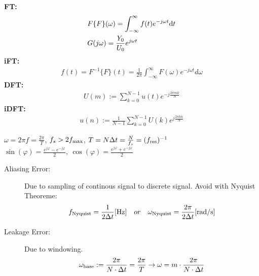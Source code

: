 \begin{tcolorbox}[colback=brown!5!white,colframe=brown!75!black,title=\textbf{Fourier Transformation}]
	\textbf{FT:}\begin{align*}
				  &F\{F\}(\omega) = \int_{-\infty}^{\infty} f(t) e^{-j\omega t}\mathrm{d} t\\
				  &G(j\omega)=\frac{Y_0}{U_0}e^{j\omega t}
	\end{align*}
	\textbf{iFT:}\begin{align*}
	f(t) = F^{-1}\{F\}(t) = \frac{1}{2\pi}\int_{-\infty}^{\infty} F(\omega) e^{-j\omega t}d\omega
	\end{align*}
	\textbf{DFT:}\begin{align*}
	U(m) := \sum_{k = 0}^{N-1} u(t)e^{-j\frac{2\pi m k}{N}}
	\end{align*}
	\textbf{iDFT:}\begin{align*}
	u(n) := \frac{1}{N-1}\sum_{k = 0}^{N-1} U(k)e^{j\frac{2\pi k n}{N}}
				  \end{align*}
\end{tcolorbox}

\begin{tcolorbox}[colback=brown!5!white,colframe=brown!75!black,title=\textbf{Useful frequency things}]
  $\omega = 2\pi f = \frac{2\pi}{T}$, \quad $f_s > 2 f_\mathrm{max}$, \quad $T = N \Delta{t} = \frac{N}{f_s} = (f_\mathrm{res})^{-1} $\quad\\
  $\sin(\varphi)=\frac{e^{j\varphi}-e^{-j\varphi}}{2},\ \cos(\varphi)=\frac{e^{j\varphi}+e^{-j\varphi}}{2}$
\end{tcolorbox}

\begin{tcolorbox}[colback=brown!5!white,colframe=brown!75!black,title=\textbf{Aliasing and Leakage Errors}]
\begin{description}
	\item[Aliasing Error:] Due to sampling of continous signal to discrete signal. Avoid with Nyquist Theoreme:
	\begin{equation*}
	f_\mathrm{Nyquist} = \frac{1}{2\Delta t} [\SI{}{\hertz}] \quad or \quad \omega_\mathrm{Nyquist} = \frac{2\pi}{2\Delta t} [\SI{}{\radian \per \second}]
	\end{equation*}
	
	\item[Leakage Error:] Due to windowing.
	\begin{equation*}
	\omega_\mathrm{base} := \frac{2\pi}{N \cdot \Delta t} = \frac{2\pi}{T} \rightarrow \omega = m\cdot \frac{2\pi }{N \cdot \Delta t}
	\end{equation*}
\end{description}
\end{tcolorbox}

